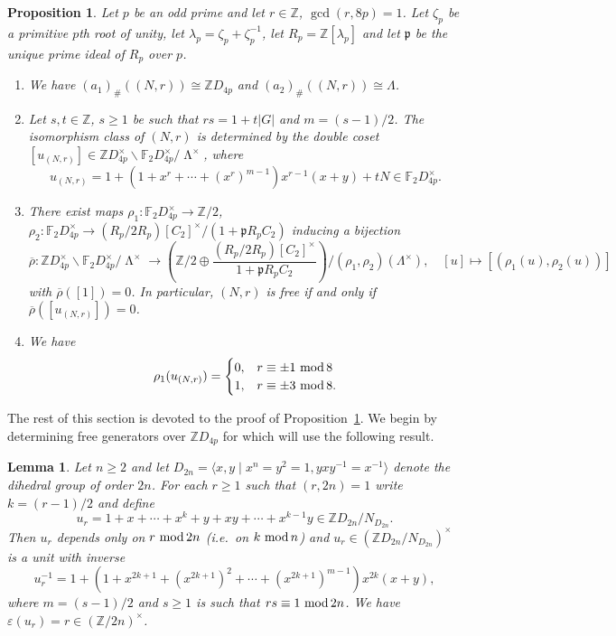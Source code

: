 \documentclass[11pt,leqno,a4paper]{amsart}
\newcommand{\Z}{\mathbb{Z}}
\newcommand{\F}{\mathbb{F}}
\renewcommand{\mod}{\,\,\text{\normalfont mod}\,}
\DeclareMathOperator{\LL}{\Lambda}
\newtheorem{prop}[thm]{Proposition}
\newtheorem{lemma}[thm]{Lemma}
\theoremstyle{definition}
\theoremstyle{remark}
\theoremstyle{custom}
\newenvironment{clist}[1]
{\begin{enumerate}[\normalfont #1]}
{\end{enumerate}}
\begin{document}
\begin{prop}\label{prop:swansetup}
Let $p$ be an odd prime and let $r \in \Z$, $\gcd(r, 8p) = 1$.
Let $\zeta_p$ be a primitive $p$th root of unity, let $\lambda_p = \zeta_p+\zeta_p^{-1}$, let $R_p = \Z[\lambda_p]$ and let $\mathfrak p$ be the unique prime ideal of $R_p$ over $p$.
\begin{clist}{(i)}
\item
    We have $(a_1)_\#((N, r)) \cong \Z D_{4p}$ and $(a_2)_\#((N, r)) \cong \Lambda$.
\item
Let $s,t \in \Z$, $s \geq 1$ be such that $rs = 1+t|G|$ and $m = (s-1)/2$. The isomorphism class of $(N, r)$ is determined by the double coset $[u_{(N, r)}] \in \Z D_{4p}^\times \backslash \F_2 D_{4p}^\times /{\LL^\times}$, where
\[ u_{(N,r)} = 1+(1+x^r + \dotsb +  (x^r)^{m-1})x^{r-1}(x+y) + tN \in \F_2 D_{4p}^\times. \]
\item
There exist maps $\rho_1 \colon \F_2 D_{4p}^\times \to \Z/2$, $\rho_2 \colon \F_2 D_{4p}^\times \to (R_p/2R_p)[C_2]^\times/(1 + \mathfrak p R_p C_2)$ inducing a bijection
\[
\overline \rho \colon \Z D_{4p}^\times \backslash \F_2 D_{4p}^\times /{\LL^\times}
\longrightarrow \left(\Z/2 \oplus \frac{(R_p/2R_p)[C_2]^\times}{1+\mathfrak{p}R_pC_2}\right) \Big/ (\rho_1, \rho_2)(\Lambda^\times), \quad [u] \mapsto [(\rho_1(u),\rho_2(u))]
\] 
with $\overline \rho([1]) = 0$.
In particular, $(N, r)$ is free if and only if $\overline \rho([u_{(N, r)}]) = 0$.
\item
We have
\[ \rho_1(u_{(N,r)}) = 
\begin{cases}
0, & r \equiv \pm 1 \mod 8 \\
1, & r \equiv \pm 3 \mod 8. 
\end{cases}
\]
\end{clist}
\end{prop}

The rest of this section is devoted to the proof of Proposition~\ref{prop:swansetup}.
We begin by determining free generators over $\Z D_{4p}$ for which will use the following result.

\begin{lemma} \label{lemma:ZG/N-unit-dihedral}
Let $n \ge 2$ and let $D_{2n} = \langle x,y \mid x^{n}=y^2=1,yxy^{-1}=x^{-1}\rangle$ denote the dihedral group of order $2n$. For each $r \ge 1$ such that $(r,2n)=1$ write $k = (r-1)/2$ and define
\[ u_r = 1+x+ \cdots + x^k + y + xy + \cdots + x^{k-1}y \in \Z D_{2n} / N_{D_{2n}}. \]
Then
$u_r$ depends only on $r \mod 2n$ (i.e.~on $k \mod n$) and
$u_r \in (\Z D_{2n} / N_{D_{2n}})^\times$ is a unit with inverse
\[ u_r^{-1} = 1+(1+x^{2k+1}+(x^{2k+1})^2 + \dotsb + (x^{2k+1})^{m-1})x^{2k}(x+y), \]
where $m = (s-1)/2$ and $s \ge 1$ is such that $rs \equiv 1 \mod 2n$.  We have $\varepsilon(u_r) = r \in (\Z/2n)^\times$.
\end{lemma}
\end{document}
